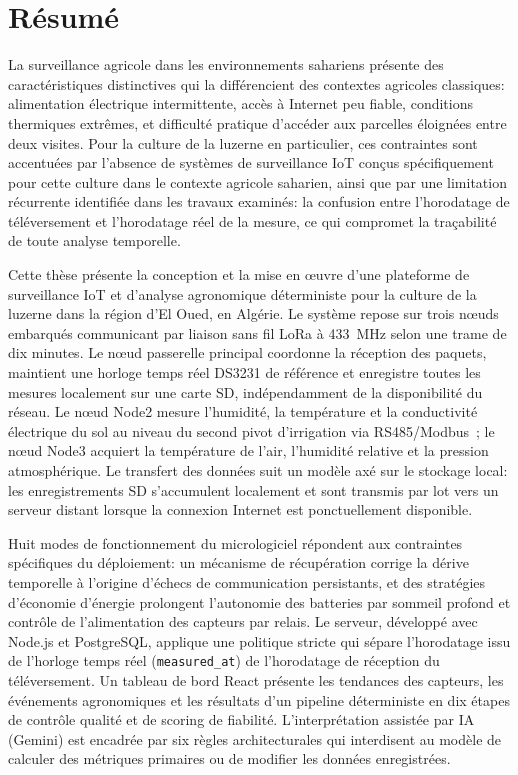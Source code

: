 
\chapter*{Résumé}

La surveillance agricole dans les environnements sahariens présente des
caractéristiques distinctives qui la différencient des contextes agricoles classiques:
alimentation électrique intermittente, accès à Internet peu fiable, conditions
thermiques extrêmes, et difficulté pratique d'accéder aux parcelles éloignées entre
deux visites. Pour la culture de la luzerne en particulier, ces contraintes sont
accentuées par l'absence de systèmes de surveillance IoT conçus spécifiquement pour
cette culture dans le contexte agricole saharien, ainsi que par une limitation
récurrente identifiée dans les travaux examinés: la confusion entre l'horodatage de
téléversement et l'horodatage réel de la mesure, ce qui compromet la traçabilité de
toute analyse temporelle.

Cette thèse présente la conception et la mise en œuvre d'une plateforme de surveillance
IoT et d'analyse agronomique déterministe pour la culture de la luzerne dans la région
d'El Oued, en Algérie. Le système repose sur trois nœuds embarqués communicant par
liaison sans fil LoRa à 433~MHz selon une trame de dix minutes. Le nœud passerelle
principal coordonne la réception des paquets, maintient une horloge temps réel DS3231
de référence et enregistre toutes les mesures localement sur une carte SD,
indépendamment de la disponibilité du réseau. Le nœud Node2 mesure l'humidité, la
température et la conductivité électrique du sol au niveau du second pivot d'irrigation
via RS485/Modbus~; le nœud Node3 acquiert la température de l'air, l'humidité relative
et la pression atmosphérique. Le transfert des données suit un modèle axé sur le
stockage local: les enregistrements SD s'accumulent localement et sont transmis par
lot vers un serveur distant lorsque la connexion Internet est ponctuellement disponible.

Huit modes de fonctionnement du micrologiciel répondent aux contraintes spécifiques du
déploiement: un mécanisme de récupération corrige la dérive temporelle à l'origine
d'échecs de communication persistants, et des stratégies d'économie d'énergie
prolongent l'autonomie des batteries par sommeil profond et contrôle de l'alimentation
des capteurs par relais. Le serveur, développé avec Node.js et PostgreSQL, applique
une politique stricte qui sépare l'horodatage issu de l'horloge temps réel
(\texttt{measured\_at}) de l'horodatage de réception du téléversement. Un tableau de
bord React présente les tendances des capteurs, les événements agronomiques et les
résultats d'un pipeline déterministe en dix étapes de contrôle qualité et de scoring
de fiabilité. L'interprétation assistée par IA (Gemini) est encadrée par six règles
architecturales qui interdisent au modèle de calculer des métriques primaires ou de
modifier les données enregistrées.

